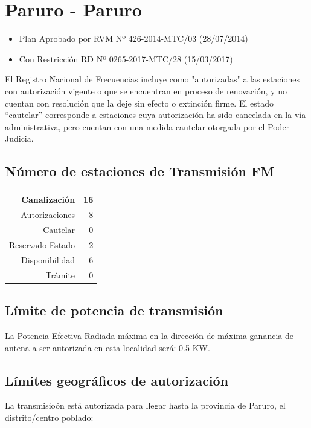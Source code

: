 \documentclass[11pt]{article}
\begin{document}
\section{Paruro - Paruro}

\begin{itemize}
	\item Plan Aprobado por RVM Nº 426-2014-MTC/03 (28/07/2014)
	\item Con Restricción RD Nº 0265-2017-MTC/28 (15/03/2017)
\end{itemize}

El Registro Nacional de Frecuencias incluye como "autorizadas" a las estaciones con autorización vigente o que se encuentran en proceso de renovación, y no cuentan con resolución que la deje sin efecto o extinción firme. El estado “cautelar” corresponde a estaciones cuya autorización ha sido cancelada en la vía administrativa, pero cuentan con una medida cautelar otorgada por el Poder Judicia.

\subsection{Número de estaciones de Transmisión FM}

\begin{tabular}{|r|r|} \hline
	Canalización 			& 16 \\ \hline
	Autorizaciones			& 8 \\ \hline
	Cautelar				& 0 \\ \hline
	Reservado Estado		& 2 \\ \hline
	Disponibilidad			& 6 \\ \hline
	Trámite					& 0 \\ \hline 
\end{tabular}

\subsection{Límite de potencia de transmisión}

La Potencia Efectiva Radiada máxima en la dirección de máxima ganancia de antena a ser autorizada en esta localidad será: 0.5 KW.

\subsection{Límites geográficos de autorización}

La transmisioón está autorizada para llegar hasta la provincia de Paruro, el distrito/centro poblado:
\end{document}
